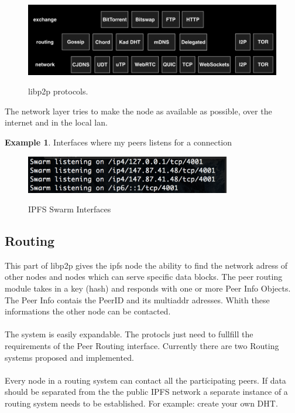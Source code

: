 \documentclass[a4paper,11pt, oneside]{report}
\theoremstyle{definition}
\newtheorem{exmp}{Example}[subsection]
\begin{document}
\begin{figure}[H]
\centering
\includegraphics[width=\textwidth]{img/libp2p-protocols.png}\\[0.8cm]
\caption[libp2p]{libp2p protocols.}
\end{figure}

\noindent
The network layer tries to make the node as available as possible, over the internet and in the local lan.

\begin{exmp} Interfaces where my peers listens for a connection
\begin{figure}[H]
\centering
\includegraphics[width=0.8\textwidth]{img/ipfs-network-listen.png}\\[0.8cm]
\caption[Swarm Interfaces]{IPFS Swarm Interfaces}
\end{figure}
\end{exmp}

\newpage

\subsection{Routing}
This part of libp2p gives the ipfs node the ability to find the network adress of other nodes and nodes which can serve specific data blocks.  The peer routing module takes in a key (hash) and responds with one or more Peer Info Objects. The Peer Info contais the PeerID and its multiaddr adresses. Whith these informations the other node can be contacted.\\ \\
The system is easily expandable. The protocls just need to fullfill the requirements of the Peer Routing interface. Currently there are two Routing systems proposed and implemented.\\ \\
Every node in a routing system can contact all the participating peers. If data should be separated from the the public IPFS network a separate instance of a routing system needs to be established. For example: create your own DHT.
\end{document}
